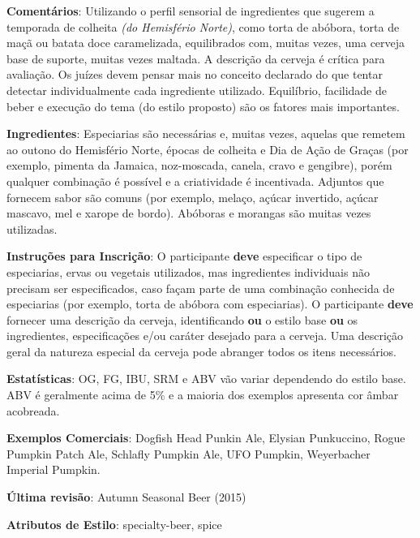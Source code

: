 \textbf{Comentários}: Utilizando o perfil sensorial de ingredientes que sugerem a temporada de colheita \textit{(do Hemisfério Norte)}, como torta de abóbora, torta de maçã ou batata doce caramelizada, equilibrados com, muitas vezes, uma cerveja base de suporte, muitas vezes maltada. A descrição da cerveja é crítica para avaliação. Os juízes devem pensar mais no conceito declarado do que tentar detectar individualmente cada ingrediente utilizado. Equilíbrio, facilidade de beber e execução do tema (do estilo proposto) são os fatores mais importantes.

\textbf{Ingredientes}: Especiarias são necessárias e, muitas vezes, aquelas que remetem ao outono do Hemisfério Norte, épocas de colheita e Dia de Ação de Graças (por exemplo, pimenta da Jamaica, noz-moscada, canela, cravo e gengibre), porém qualquer combinação é possível e a criatividade é incentivada. Adjuntos que fornecem sabor são comuns (por exemplo, melaço, açúcar invertido, açúcar mascavo, mel e xarope de bordo). Abóboras e morangas são muitas vezes utilizadas.

\textbf{Instruções para Inscrição}: O participante \textbf{deve} especificar o tipo de especiarias, ervas ou vegetais utilizados, mas ingredientes individuais não precisam ser especificados, caso façam parte de uma combinação conhecida de especiarias (por exemplo, torta de abóbora com especiarias). O participante \textbf{deve} fornecer uma descrição da cerveja, identificando \textbf{ou} o estilo base \textbf{ou} os ingredientes, especificações e/ou caráter desejado para a cerveja. Uma descrição geral da natureza especial da cerveja pode abranger todos os itens necessários.

\textbf{Estatísticas}: OG, FG, IBU, SRM e ABV vão variar dependendo do estilo base. ABV é geralmente acima de 5\% e a maioria dos exemplos apresenta cor âmbar acobreada.

\textbf{Exemplos Comerciais}: Dogfish Head Punkin Ale, Elysian Punkuccino, Rogue Pumpkin Patch Ale, Schlafly Pumpkin Ale, UFO Pumpkin, Weyerbacher Imperial Pumpkin.

\textbf{Última revisão}: Autumn Seasonal Beer (2015)

\textbf{Atributos de Estilo}: specialty-beer, spice
